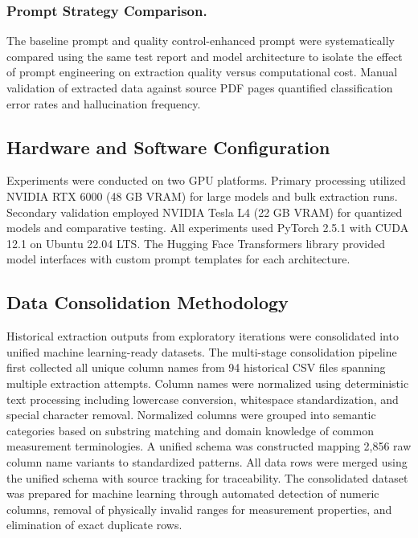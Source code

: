 \documentclass{svproc}
\begin{document}
\subsubsection{Prompt Strategy Comparison.}

The baseline prompt and quality control-enhanced prompt were systematically compared using the same test report and model architecture to isolate the effect of prompt engineering on extraction quality versus computational cost. Manual validation of extracted data against source PDF pages quantified classification error rates and hallucination frequency.

\subsection{Hardware and Software Configuration}

Experiments were conducted on two GPU platforms. Primary processing utilized NVIDIA RTX 6000 (48 GB VRAM) for large models and bulk extraction runs. Secondary validation employed NVIDIA Tesla L4 (22 GB VRAM) for quantized models and comparative testing. All experiments used PyTorch 2.5.1 with CUDA 12.1 on Ubuntu 22.04 LTS. The Hugging Face Transformers library provided model interfaces with custom prompt templates for each architecture.

\subsection{Data Consolidation Methodology}

Historical extraction outputs from exploratory iterations were consolidated into unified machine learning-ready datasets. The multi-stage consolidation pipeline first collected all unique column names from 94 historical CSV files spanning multiple extraction attempts. Column names were normalized using deterministic text processing including lowercase conversion, whitespace standardization, and special character removal. Normalized columns were grouped into semantic categories based on substring matching and domain knowledge of common measurement terminologies. A unified schema was constructed mapping 2,856 raw column name variants to standardized patterns. All data rows were merged using the unified schema with source tracking for traceability. The consolidated dataset was prepared for machine learning through automated detection of numeric columns, removal of physically invalid ranges for measurement properties, and elimination of exact duplicate rows.
\end{document}
